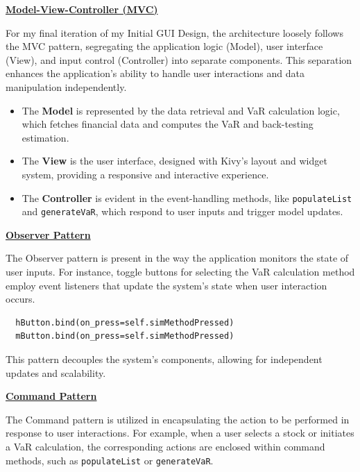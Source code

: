 \documentclass{article}
\begin{document}
\underline{\textbf{Model-View-Controller (MVC)}}\\\vspace{0.3cm}

For my final iteration of my Initial GUI Design, the architecture loosely follows the MVC pattern, segregating the application logic (Model), user interface (View), and input control (Controller) into separate components. This separation enhances the application's ability to handle user interactions and data manipulation independently.

\begin{itemize}
    \item The \textbf{Model} is represented by the data retrieval and VaR calculation logic, which fetches financial data and computes the VaR and back-testing estimation.
    \item The \textbf{View} is the user interface, designed with Kivy's layout and widget system, providing a responsive and interactive experience.
    \item The \textbf{Controller} is evident in the event-handling methods, like \texttt{populateList} and \texttt{generateVaR}, which respond to user inputs and trigger model updates.
\end{itemize}

\underline{\textbf{Observer Pattern}}\\\vspace{0.3cm}

The Observer pattern is present in the way the application monitors the state of user inputs. For instance, toggle buttons for selecting the VaR calculation method employ event listeners that update the system's state when user interaction occurs.

\begin{verbatim}
  hButton.bind(on_press=self.simMethodPressed)
  mButton.bind(on_press=self.simMethodPressed)
\end{verbatim}

This pattern decouples the system's components, allowing for independent updates and scalability.\\\vspace{0.3cm}

\underline{\textbf{Command Pattern}}\\\vspace{0.3cm}

The Command pattern is utilized in encapsulating the action to be performed in response to user interactions. For example, when a user selects a stock or initiates a VaR calculation, the corresponding actions are enclosed within command methods, such as \texttt{populateList} or \texttt{generateVaR}.
\end{document}
